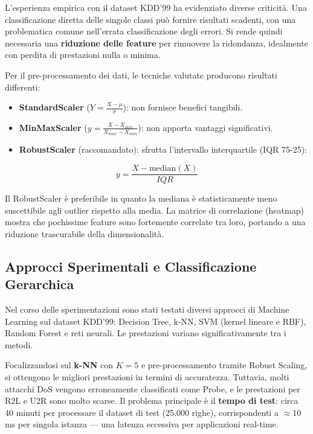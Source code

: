 L'esperienza empirica con il dataset KDD'99 ha evidenziato
diverse criticità. Una classificazione diretta delle
singole classi può fornire risultati scadenti, con
una problematica comune nell'errata classificazione
degli errori. Si rende quindi necessaria una
\textbf{riduzione delle feature} per rimuovere la
ridondanza, idealmente con perdita di prestazioni
nulla o minima.

Per il pre-processamento dei dati, le tecniche valutate
producono risultati differenti:

\begin{itemize}
    \item \textbf{StandardScaler}
        ($Y = \frac{X - \mu}{\sigma}$): non fornisce
        benefici tangibili.
    \item \textbf{MinMaxScaler}
        ($y = \frac{X - X_{min}}{X_{max} - X_{min}}$):
        non apporta vantaggi significativi.
    \item \textbf{RobustScaler} (raccomandato): sfrutta
        l'intervallo interquartile (IQR 75-25):
\end{itemize}

\begin{equation}
    y = \frac{X - \text{median}(X)}{IQR}
\end{equation}

Il RobustScaler è preferibile in quanto la mediana è
statisticamente meno suscettibile agli outlier rispetto
alla media. La matrice di correlazione (heatmap) mostra
che pochissime feature sono fortemente correlate tra
loro, portando a una riduzione trascurabile della
dimensionalità.

\subsection{Approcci Sperimentali e Classificazione
Gerarchica}

Nel corso delle sperimentazioni sono stati testati
diversi approcci di Machine Learning sul dataset KDD'99:
Decision Tree, k-NN, SVM (kernel lineare e RBF),
Random Forest e reti neurali. Le prestazioni variano
significativamente tra i metodi.

Focalizzandosi sul \textbf{k-NN} con $K=5$ e
pre-processamento tramite Robust Scaling, si ottengono
le migliori prestazioni in termini di accuratezza.
Tuttavia, molti attacchi DoS vengono erroneamente
classificati come Probe, e le prestazioni per R2L e U2R
sono molto scarse. Il problema principale è il
\textbf{tempo di test}: circa 40 minuti per processare
il dataset di test (25.000 righe), corrispondenti a
$\approx 10$ ms per singola istanza — una latenza
eccessiva per applicazioni real-time.

